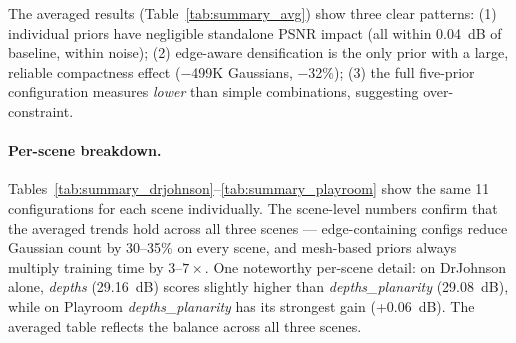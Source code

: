 The averaged results (Table~\ref{tab:summary_avg}) show three clear patterns: (1) individual priors have negligible standalone PSNR impact (all within 0.04~dB of baseline, within noise); (2) edge-aware densification is the only prior with a large, reliable compactness effect ($-$499K Gaussians, $-$32\%); (3) the full five-prior configuration measures \emph{lower} than simple combinations, suggesting over-constraint.

\paragraph{Per-scene breakdown.}
Tables~\ref{tab:summary_drjohnson}--\ref{tab:summary_playroom} show the same 11 configurations for each scene individually. The scene-level numbers confirm that the averaged trends hold across all three scenes — edge-containing configs reduce Gaussian count by 30--35\% on every scene, and mesh-based priors always multiply training time by $3$--$7\times$. One noteworthy per-scene detail: on DrJohnson alone, \textit{depths} (29.16~dB) scores slightly higher than \textit{depths\_\allowbreak planarity} (29.08~dB), while on Playroom \textit{depths\_\allowbreak planarity} has its strongest gain (+0.06~dB). The averaged table reflects the balance across all three scenes.

